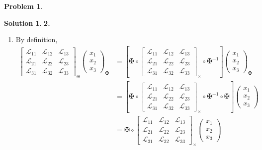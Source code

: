 \documentclass{book}
\theoremstyle{definition}
\newtheorem*{prob*}{Problem}
\newtheorem*{sln*}{Solution}
\newcommand{\lag}{\mathcal{L}}
\begin{document}
\begin{prob*}
	\begin{sln*}\textbf{2.}
		\begin{enumerate}
			\item  By definition,
			\begin{align*}
			\begin{bmatrix}
			\lag_{11} & \lag_{12} & \lag_{13}\\
			\lag_{21} & \lag_{22} & \lag_{23}\\
			\lag_{31} & \lag_{32} & \lag_{33}
			\end{bmatrix}_{\oplus}
			\begin{pmatrix}
			x_1\\x_2\\x_3
			\end{pmatrix}_{\maltese} 
			&=
			\left[\maltese
			\circ
			\begin{bmatrix}
			\lag_{11} & \lag_{12} & \lag_{13}\\
			\lag_{21} & \lag_{22} & \lag_{23}\\
			\lag_{31} & \lag_{32} & \lag_{33}
			\end{bmatrix}_\times 
			\circ 
			\maltese^{-1}\right]\begin{pmatrix}
			x_1\\x_2\\x_3
			\end{pmatrix}_{\maltese} \\
			&= \left[\maltese
			\circ
			\begin{bmatrix}
			\lag_{11} & \lag_{12} & \lag_{13}\\
			\lag_{21} & \lag_{22} & \lag_{23}\\
			\lag_{31} & \lag_{32} & \lag_{33}
			\end{bmatrix}_\times 
			\circ 
			\maltese^{-1}\circ\maltese\right]\begin{pmatrix}
			x_1\\x_2\\x_3
			\end{pmatrix}\\
			&= \maltese
			\circ
			\begin{bmatrix}
			\lag_{11} & \lag_{12} & \lag_{13}\\
			\lag_{21} & \lag_{22} & \lag_{23}\\
			\lag_{31} & \lag_{32} & \lag_{33}
			\end{bmatrix}_\times \begin{pmatrix}
			x_1\\x_2\\x_3
			\end{pmatrix}\\

\end{align*}
\end{enumerate}
\end{sln*}
\end{prob*}
\end{document}
